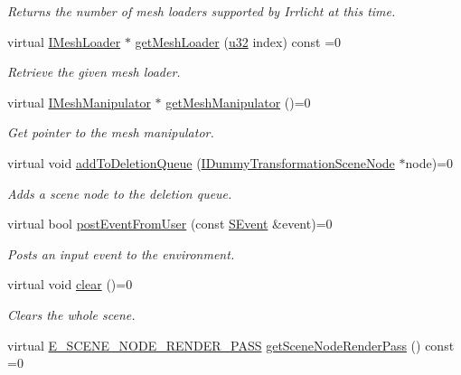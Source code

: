 \begin{DoxyCompactItemize}
\begin{DoxyCompactList}\small\item\em Returns the number of mesh loaders supported by Irrlicht at this time. \end{DoxyCompactList}\item 
virtual \hyperlink{classirr_1_1scene_1_1IMeshLoader}{I\+Mesh\+Loader} $\ast$ \hyperlink{classirr_1_1scene_1_1ISceneManager_a9fd2e6e1f82298b9b95e96d2b36ddc33}{get\+Mesh\+Loader} (\hyperlink{namespaceirr_a0416a53257075833e7002efd0a18e804}{u32} index) const  =0
\begin{DoxyCompactList}\small\item\em Retrieve the given mesh loader. \end{DoxyCompactList}\item 
virtual \hyperlink{classirr_1_1scene_1_1IMeshManipulator}{I\+Mesh\+Manipulator} $\ast$ \hyperlink{classirr_1_1scene_1_1ISceneManager_a05138d6b5f99fced0061794fb5c42318}{get\+Mesh\+Manipulator} ()=0
\begin{DoxyCompactList}\small\item\em Get pointer to the mesh manipulator. \end{DoxyCompactList}\item 
virtual void \hyperlink{classirr_1_1scene_1_1ISceneManager_a4c29710a7802881200a26384313bd14c}{add\+To\+Deletion\+Queue} (\hyperlink{classirr_1_1scene_1_1IDummyTransformationSceneNode}{I\+Dummy\+Transformation\+Scene\+Node} $\ast$node)=0
\begin{DoxyCompactList}\small\item\em Adds a scene node to the deletion queue. \end{DoxyCompactList}\item 
virtual bool \hyperlink{classirr_1_1scene_1_1ISceneManager_ac68aa8d654884f19ad52fa28f11db424}{post\+Event\+From\+User} (const \hyperlink{structirr_1_1SEvent}{S\+Event} \&event)=0
\begin{DoxyCompactList}\small\item\em Posts an input event to the environment. \end{DoxyCompactList}\item 
virtual void \hyperlink{classirr_1_1scene_1_1ISceneManager_abaa3d11a833b89f7579848e234881988}{clear} ()=0
\begin{DoxyCompactList}\small\item\em Clears the whole scene. \end{DoxyCompactList}\item 
virtual \hyperlink{namespaceirr_1_1scene_a7862269bd1abc123929d4dbb8200d67f}{E\+\_\+\+S\+C\+E\+N\+E\+\_\+\+N\+O\+D\+E\+\_\+\+R\+E\+N\+D\+E\+R\+\_\+\+P\+A\+SS} \hyperlink{classirr_1_1scene_1_1ISceneManager_a7f92b38444d719c4d2314242884e4951}{get\+Scene\+Node\+Render\+Pass} () const  =0

\end{DoxyCompactItemize}
